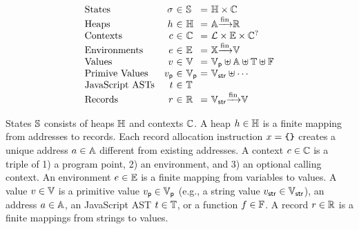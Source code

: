 \[
  \begin{array}{lr@{~}c@{~}l@{~}c@{~}l}
    \text{States} & \st &\in& \stset &=&
    \heapset \times \ctxtset\\
    \text{Heaps} & \heap &\in& \heapset &=&
    \addrset \finmap \recset\\
    \text{Contexts} & \ctxt &\in& \ctxtset &=&
    \labset \times \envset \times \ctxtset^?\\
    \text{Environments} & \env &\in& \envset &=&
    \varset \finmap \valset\\
    \text{Values} & \val &\in& \valset &=&
    \pvalset \uplus \addrset \uplus \treeset \uplus \funcset\\
    \text{Primive Values} & \pval &\in& \pvalset &=&
    \strset \uplus \cdots\\
    \text{JavaScript ASTs} & \tree &\in& \treeset\\
    \text{Records} & \rec &\in& \recset &=&
    \strset \finmap \valset\\
  \end{array}
\]

States $\mathbb{S}$ consists of heaps $\mathbb{H}$ and contexts $\mathbb{C}$.  A heap
$h \in \mathbb{H}$ is a finite mapping from addresses to records.  Each record
allocation instruction $x = \texttt{\{} \texttt{\}}$ creates a unique address $a \in
\mathbb{A}$ different from existing addresses.  A context $c \in \mathbb{C}$ is
a triple of 1) a program point, 2) an environment, and 3) an optional calling
context.  An environment $e \in \mathbb{E}$ is a finite mapping from variables
to values. A value $v \in \mathbb{V}$ is a primitive value $v_{\textsf{p}} \in \mathbb{V}_{\textsf{p}}$
(e.g., a string value $v_{\textsf{str}} \in \mathbb{V}_{\textsf{str}}$), an address $a \in \mathbb{A}$, an
JavaScript AST $t \in \mathbb{T}$, or a function $f \in \mathbb{F}$.  A record
$r \in \mathbb{R}$ is a finite mappings from strings to values.
